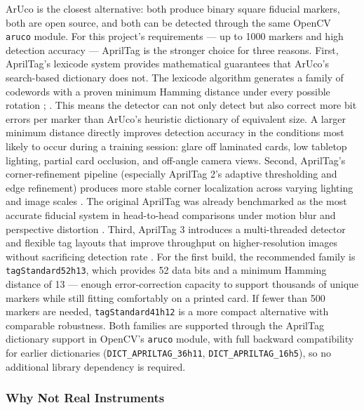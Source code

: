 \documentclass[10pt,a4paper]{article}
\begin{document}
ArUco is the closest alternative: both produce binary square fiducial markers,
both are open source, and both can be detected through the same OpenCV \texttt{aruco}
module. For this project's requirements — up to 1000 markers and high detection
accuracy — AprilTag is the stronger choice for three reasons.
First, AprilTag's lexicode system provides mathematical guarantees that ArUco's
search-based dictionary does not. The lexicode algorithm generates a family of
codewords with a proven minimum Hamming distance under every possible rotation
\cite{olson-2011};
\cite{wang-et-al-2016-apriltag}. This means the
detector can not only detect but also correct more bit errors per marker than
ArUco's heuristic dictionary of equivalent size. A larger minimum distance
directly improves detection accuracy in the conditions most likely to occur
during a training session: glare off laminated cards, low tabletop lighting,
partial card occlusion, and off-angle camera views.
Second, AprilTag's corner-refinement pipeline (especially AprilTag 2's
adaptive thresholding and edge refinement) produces more stable corner
localization across varying lighting and image scales
\cite{wang-et-al-2016-apriltag}. The original
AprilTag was already benchmarked as the most accurate fiducial system in
head-to-head comparisons under motion blur and perspective distortion
\cite{kalaitzakis-et-al-2021}.
Third, AprilTag 3 introduces a multi-threaded detector and flexible tag layouts
that improve throughput on higher-resolution images without sacrificing
detection rate
\cite{krogius-et-al-2019}. For the first
build, the recommended family is \texttt{tagStandard52h13}, which provides 52 data
bits and a minimum Hamming distance of 13 — enough error-correction capacity
to support thousands of unique markers while still fitting comfortably on a
printed card. If fewer than 500 markers are needed, \texttt{tagStandard41h12} is a
more compact alternative with comparable robustness. Both families are
supported through the AprilTag dictionary support in OpenCV's \texttt{aruco} module,
with full backward compatibility for earlier dictionaries
(\texttt{DICT\_APRILTAG\_36h11}, \texttt{DICT\_APRILTAG\_16h5}), so no additional library
dependency is required.
\subsubsection{Why Not Real Instruments}
\end{document}
